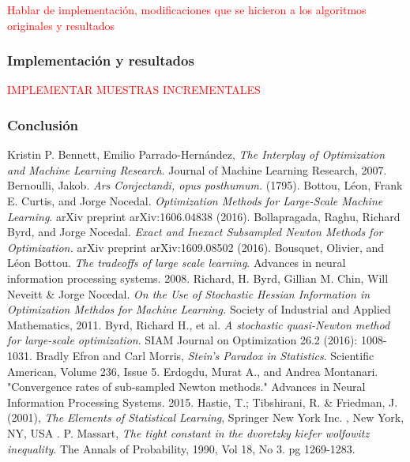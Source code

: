 \documentclass{book}
\theoremstyle{plain}
\theoremstyle{definition}
\theoremstyle{remark}
\begin{document}
\newpage

\textcolor{red}{Hablar de implementación, modificaciones que se hicieron a los algoritmos originales y resultados}



\subsubsection{Implementación y resultados}

\textcolor{red}{IMPLEMENTAR MUESTRAS INCREMENTALES}

\subsubsection{Conclusión}


\begin{thebibliography}{9}
 Kristin P. Bennett, Emilio Parrado-Hernández, \emph{The Interplay of Optimization and Machine Learning Research}. Journal of Machine Learning Research, 2007.
Bernoulli, Jakob. \emph{Ars Conjectandi, opus posthumum.} (1795).
  Bottou, Léon, Frank E. Curtis, and Jorge Nocedal. \emph{Optimization Methods for Large-Scale Machine Learning}. arXiv preprint arXiv:1606.04838 (2016).
Bollapragada, Raghu, Richard Byrd, and Jorge Nocedal. \emph{Exact and Inexact Subsampled Newton Methods for Optimization.} arXiv preprint arXiv:1609.08502 (2016).
Bousquet, Olivier, and Léon Bottou. \emph{The tradeoffs of large scale learning}. Advances in neural information processing systems. 2008.
 Richard, H. Byrd, Gillian M. Chin, Will Neveitt \& Jorge Nocedal.
  \emph{On the Use of Stochastic Hessian Information in Optimization Methdos for Machine Learning.} Society of Industrial and Applied Mathematics, 2011.
 Byrd, Richard H., et al. \emph{A stochastic quasi-Newton method for large-scale optimization}. SIAM Journal on Optimization 26.2 (2016): 1008-1031.
 Bradly Efron and Carl Morris, \emph{Stein's Paradox in Statistics}. Scientific American, Volume 236, Issue 5.
Erdogdu, Murat A., and Andrea Montanari. "Convergence rates of sub-sampled Newton methods." Advances in Neural Information Processing Systems. 2015.
 Hastie, T.; Tibshirani, R. \& Friedman, J. (2001), \emph{The Elements of Statistical Learning}, Springer New York Inc. , New York, NY, USA .
 P. Massart, \emph{The tight constant in the dvoretzky kiefer wolfowitz inequality}. The Annals of Probability, 1990, Vol 18, No 3. pg 1269-1283.

\end{thebibliography}
\end{document}

